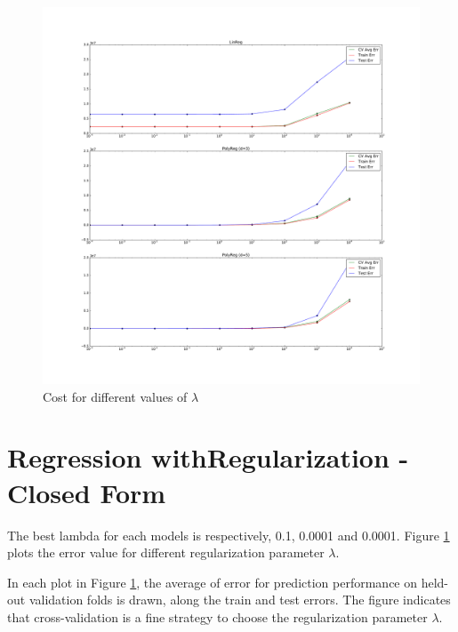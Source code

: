 \documentclass[paper=a4, fontsize=11pt]{scrartcl} %
\numberwithin{figure}{section} %
\numberwithin{table}{section} %
\begin{document}
\begin{figure}
\begin{center}
\includegraphics[width=13cm]{plot3.pdf}
\caption{Cost for different values of $\lambda$}
\label{fig3}
\end{center}
\end{figure}

\section{Regression withRegularization - Closed Form}

The best lambda for each models is respectively, 0.1, 0.0001 and 0.0001. Figure \ref{fig3} plots the error value for different regularization parameter $\lambda$.

In each plot in Figure \ref{fig3}, the average of error for prediction performance on held-out validation folds is drawn, along the train and test errors. The figure indicates that cross-validation is a fine strategy to choose the regularization parameter $\lambda$.
\end{document}
